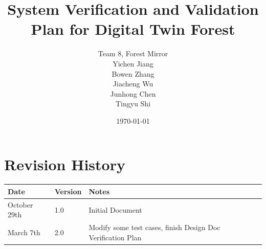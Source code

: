 \documentclass[12pt, titlepage]{article}
\begin{document}
\title{System Verification and Validation Plan for Digital Twin Forest} 
\author{Team 8, Forest Mirror\\Yichen Jiang\\ Bowen Zhang\\ Jiacheng Wu\\ Junhong Chen\\ Tingyu Shi}
\date{\today}
	
\maketitle


\section{Revision History}

\begin{tabularx}{\textwidth}{p{3cm}p{2cm}X}
\toprule {\bf Date} & {\bf Version} & {\bf Notes}\\
\midrule
October 29th & 1.0 & Initial Document\\
March 7th & 2.0 & Modify some test cases, finish Design Doc Verification
Plan\\
\bottomrule
\end{tabularx}

\newpage

\tableofcontents
\listoftables
\listoffigures

\newpage
\end{document}
